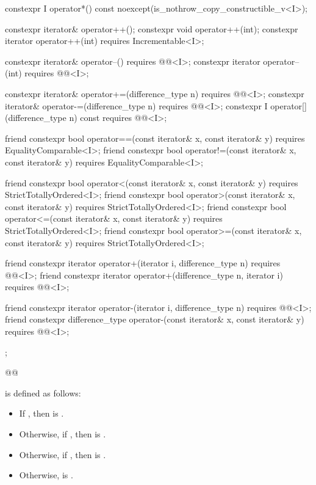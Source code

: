 {\begin{codeblock}
{{    constexpr I operator*() const noexcept(is_nothrow_copy_constructible_v<I>);

    constexpr iterator& operator++();
    constexpr void operator++(int);
    constexpr iterator operator++(int) requires Incrementable<I>;

    constexpr iterator& operator--() requires @@<I>;
    constexpr iterator operator--(int) requires @@<I>;

    constexpr iterator& operator+=(difference_type n)
      requires @@<I>;
    constexpr iterator& operator-=(difference_type n)
      requires @@<I>;
    constexpr I operator[](difference_type n) const
      requires @@<I>;

    friend constexpr bool operator==(const iterator& x, const iterator& y)
      requires EqualityComparable<I>;
    friend constexpr bool operator!=(const iterator& x, const iterator& y)
      requires EqualityComparable<I>;

    friend constexpr bool operator<(const iterator& x, const iterator& y)
      requires StrictTotallyOrdered<I>;
    friend constexpr bool operator>(const iterator& x, const iterator& y)
      requires StrictTotallyOrdered<I>;
    friend constexpr bool operator<=(const iterator& x, const iterator& y)
      requires StrictTotallyOrdered<I>;
    friend constexpr bool operator>=(const iterator& x, const iterator& y)
      requires StrictTotallyOrdered<I>;

    friend constexpr iterator operator+(iterator i, difference_type n)
      requires @@<I>;
    friend constexpr iterator operator+(difference_type n, iterator i)
      requires @@<I>;

    friend constexpr iterator operator-(iterator i, difference_type n)
      requires @@<I>;
    friend constexpr difference_type operator-(const iterator& x, const iterator& y)
      requires @@<I>;
  };
}@\oldtxt{\}}@
\end{codeblock}

\pnum
{} is defined as follows:
\begin{itemize}
\item If    , then
 is .
\item Otherwise, if    , then
 is .
\item Otherwise, if    , then
 is .
\item Otherwise,  is .
\end{itemize}

}
